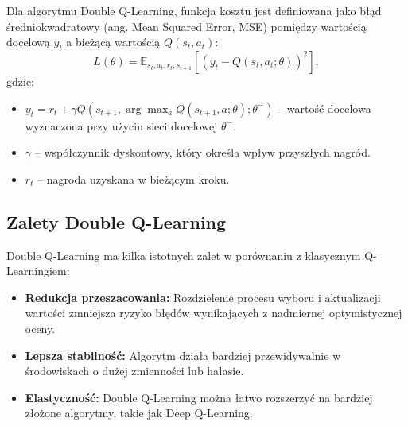 Dla algorytmu Double Q-Learning, funkcja kosztu jest definiowana jako błąd średniokwadratowy (ang. Mean Squared Error, MSE) pomiędzy wartością docelową \(y_t\) a bieżącą wartością \(Q(s_t, a_t)\):
\[
	L(\theta) = \mathbb{E}_{s_t, a_t, r_t, s_{t+1}} \left[ \left( y_t - Q(s_t, a_t; \theta) \right)^2 \right],
\]
gdzie:
\begin{itemize}
	\item \(y_t = r_t + \gamma Q(s_{t+1}, \arg\max_a Q(s_{t+1}, a; \theta); \theta^{-})\) – wartość docelowa wyznaczona przy użyciu sieci docelowej \(\theta^{-}\).
	\item \(\gamma\) – współczynnik dyskontowy, który określa wpływ przyszłych nagród.
	\item \(r_t\) – nagroda uzyskana w bieżącym kroku.
\end{itemize}

\subsection{Zalety Double Q-Learning}

Double Q-Learning ma kilka istotnych zalet w porównaniu z klasycznym Q-Learningiem:
\begin{itemize}
	\item \textbf{Redukcja przeszacowania:} Rozdzielenie procesu wyboru i aktualizacji wartości zmniejsza ryzyko błędów wynikających z nadmiernej optymistycznej oceny.
	\item \textbf{Lepsza stabilność:} Algorytm działa bardziej przewidywalnie w środowiskach o dużej zmienności lub hałasie.
	\item \textbf{Elastyczność:} Double Q-Learning można łatwo rozszerzyć na bardziej złożone algorytmy, takie jak Deep Q-Learning.
\end{itemize}
